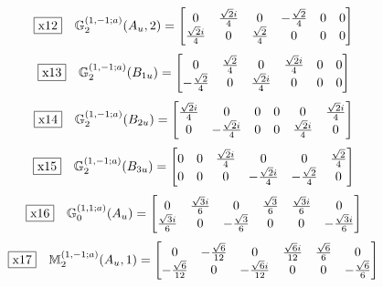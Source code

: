 \documentclass[fleqn,10pt,landscape]{jsarticle}
\begin{document}
\begin{dmath*}
\fbox{x12}\quad \mathbb{G}_{2}^{(1,-1;a)}(A_{u},2)=\begin{bmatrix} 0 & \frac{\sqrt{2} i}{4} & 0 & - \frac{\sqrt{2}}{4} & 0 & 0 \\ \frac{\sqrt{2} i}{4} & 0 & \frac{\sqrt{2}}{4} & 0 & 0 & 0 \end{bmatrix}
\end{dmath*}
\begin{dmath*}
\fbox{x13}\quad \mathbb{G}_{2}^{(1,-1;a)}(B_{1u})=\begin{bmatrix} 0 & \frac{\sqrt{2}}{4} & 0 & \frac{\sqrt{2} i}{4} & 0 & 0 \\ - \frac{\sqrt{2}}{4} & 0 & \frac{\sqrt{2} i}{4} & 0 & 0 & 0 \end{bmatrix}
\end{dmath*}
\begin{dmath*}
\fbox{x14}\quad \mathbb{G}_{2}^{(1,-1;a)}(B_{2u})=\begin{bmatrix} \frac{\sqrt{2} i}{4} & 0 & 0 & 0 & 0 & \frac{\sqrt{2} i}{4} \\ 0 & - \frac{\sqrt{2} i}{4} & 0 & 0 & \frac{\sqrt{2} i}{4} & 0 \end{bmatrix}
\end{dmath*}
\begin{dmath*}
\fbox{x15}\quad \mathbb{G}_{2}^{(1,-1;a)}(B_{3u})=\begin{bmatrix} 0 & 0 & \frac{\sqrt{2} i}{4} & 0 & 0 & \frac{\sqrt{2}}{4} \\ 0 & 0 & 0 & - \frac{\sqrt{2} i}{4} & - \frac{\sqrt{2}}{4} & 0 \end{bmatrix}
\end{dmath*}
\begin{dmath*}
\fbox{x16}\quad \mathbb{G}_{0}^{(1,1;a)}(A_{u})=\begin{bmatrix} 0 & \frac{\sqrt{3} i}{6} & 0 & \frac{\sqrt{3}}{6} & \frac{\sqrt{3} i}{6} & 0 \\ \frac{\sqrt{3} i}{6} & 0 & - \frac{\sqrt{3}}{6} & 0 & 0 & - \frac{\sqrt{3} i}{6} \end{bmatrix}
\end{dmath*}
\begin{dmath*}
\fbox{x17}\quad \mathbb{M}_{2}^{(1,-1;a)}(A_{u},1)=\begin{bmatrix} 0 & - \frac{\sqrt{6}}{12} & 0 & \frac{\sqrt{6} i}{12} & \frac{\sqrt{6}}{6} & 0 \\ - \frac{\sqrt{6}}{12} & 0 & - \frac{\sqrt{6} i}{12} & 0 & 0 & - \frac{\sqrt{6}}{6} \end{bmatrix}
\end{dmath*}
\end{document}
